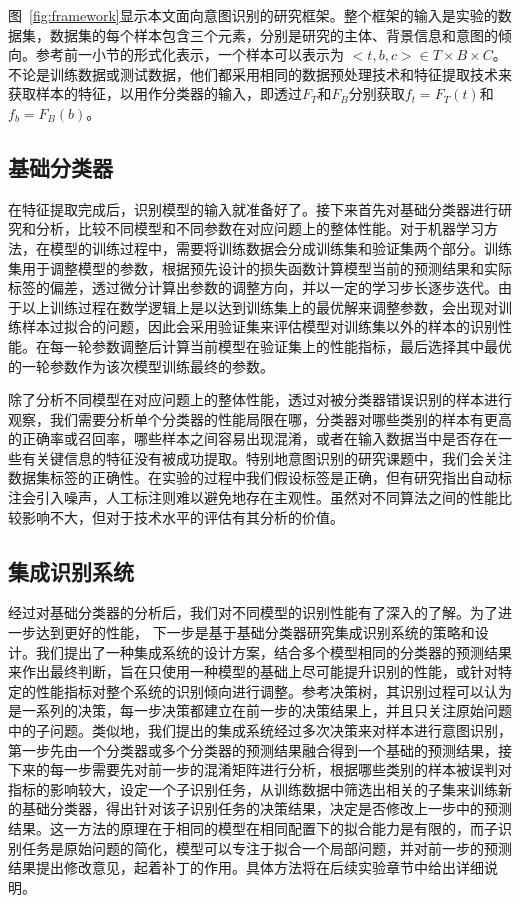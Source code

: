 图~\ref{fig:framework}显示本文面向意图识别的研究框架。整个框架的输入是实验的数据集，数据集的每个样本包含三个元素，分别是研究的主体、背景信息和意图的倾向。参考前一小节的形式化表示，一个样本可以表示为 $<t, b, c> \in T \times B \times C$。不论是训练数据或测试数据，他们都采用相同的数据预处理技术和特征提取技术来获取样本的特征，以用作分类器的输入，即透过$F_T$和$F_B$分别获取$f_t=F_T(t)$和$f_b=F_B(b)$。

\subsection{基础分类器}

在特征提取完成后，识别模型的输入就准备好了。接下来首先对基础分类器进行研究和分析，比较不同模型和不同参数在对应问题上的整体性能。对于机器学习方法，在模型的训练过程中，需要将训练数据会分成训练集和验证集两个部分。训练集用于调整模型的参数，根据预先设计的损失函数计算模型当前的预测结果和实际标签的偏差，透过微分计算出参数的调整方向，并以一定的学习步长逐步迭代。由于以上训练过程在数学逻辑上是以达到训练集上的最优解来调整参数，会出现对训练样本过拟合的问题，因此会采用验证集来评估模型对训练集以外的样本的识别性能。在每一轮参数调整后计算当前模型在验证集上的性能指标，最后选择其中最优的一轮参数作为该次模型训练最终的参数。

除了分析不同模型在对应问题上的整体性能，透过对被分类器错误识别的样本进行观察，我们需要分析单个分类器的性能局限在哪，分类器对哪些类别的样本有更高的正确率或召回率，哪些样本之间容易出现混淆，或者在输入数据当中是否存在一些有关键信息的特征没有被成功提取。特别地意图识别的研究课题中，我们会关注数据集标签的正确性。在实验的过程中我们假设标签是正确，但有研究指出自动标注会引入噪声\cite{littlestone1988learning}，人工标注则难以避免地存在主观性。虽然对不同算法之间的性能比较影响不大，但对于技术水平的评估有其分析的价值。

\subsection{集成识别系统}

经过对基础分类器的分析后，我们对不同模型的识别性能有了深入的了解。为了进一步达到更好的性能，
下一步是基于基础分类器研究集成识别系统的策略和设计。我们提出了一种集成系统的设计方案，结合多个模型相同的分类器的预测结果来作出最终判断，旨在只使用一种模型的基础上尽可能提升识别的性能，或针对特定的性能指标对整个系统的识别倾向进行调整。参考决策树，其识别过程可以认为是一系列的决策，每一步决策都建立在前一步的决策结果上，并且只关注原始问题中的子问题。类似地，我们提出的集成系统经过多次决策来对样本进行意图识别，第一步先由一个分类器或多个分类器的预测结果融合得到一个基础的预测结果，接下来的每一步需要先对前一步的混淆矩阵进行分析，根据哪些类别的样本被误判对指标的影响较大，设定一个子识别任务，从训练数据中筛选出相关的子集来训练新的基础分类器，得出针对该子识别任务的决策结果，决定是否修改上一步中的预测结果。这一方法的原理在于相同的模型在相同配置下的拟合能力是有限的，而子识别任务是原始问题的简化，模型可以专注于拟合一个局部问题，并对前一步的预测结果提出修改意见，起着补丁的作用。具体方法将在后续实验章节中给出详细说明。

